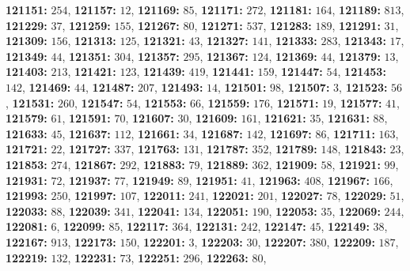 \textsf{\bfseries 121151:} $254$, \textsf{\bfseries 121157:} $12$, \textsf{\bfseries 121169:} $85$, \textsf{\bfseries 121171:} $272$, \textsf{\bfseries 121181:} $164$, \textsf{\bfseries 121189:} $813$, \textsf{\bfseries 121229:} $37$, \textsf{\bfseries 121259:} $155$, \textsf{\bfseries 121267:} $80$, \textsf{\bfseries 121271:} $537$, \textsf{\bfseries 121283:} $189$, \textsf{\bfseries 121291:} $31$, \textsf{\bfseries 121309:} $156$, \textsf{\bfseries 121313:} $125$, \textsf{\bfseries 121321:} $43$, \textsf{\bfseries 121327:} $141$, \textsf{\bfseries 121333:} $283$, \textsf{\bfseries 121343:} $17$, \textsf{\bfseries 121349:} $44$, \textsf{\bfseries 121351:} $304$, \textsf{\bfseries 121357:} $295$, \textsf{\bfseries 121367:} $124$, \textsf{\bfseries 121369:} $44$, \textsf{\bfseries 121379:} $13$, \textsf{\bfseries 121403:} $213$, \textsf{\bfseries 121421:} $123$, \textsf{\bfseries 121439:} $419$, \textsf{\bfseries 121441:} $159$, \textsf{\bfseries 121447:} $54$, \textsf{\bfseries 121453:} $142$, \textsf{\bfseries 121469:} $44$, \textsf{\bfseries 121487:} $207$, \textsf{\bfseries 121493:} $14$, \textsf{\bfseries 121501:} $98$, \textsf{\bfseries 121507:} $3$, \textsf{\bfseries 121523:} $56$, \textsf{\bfseries 121531:} $260$, \textsf{\bfseries 121547:} $54$, \textsf{\bfseries 121553:} $66$, \textsf{\bfseries 121559:} $176$, \textsf{\bfseries 121571:} $19$, \textsf{\bfseries 121577:} $41$, \textsf{\bfseries 121579:} $61$, \textsf{\bfseries 121591:} $70$, \textsf{\bfseries 121607:} $30$, \textsf{\bfseries 121609:} $161$, \textsf{\bfseries 121621:} $35$, \textsf{\bfseries 121631:} $88$, \textsf{\bfseries 121633:} $45$, \textsf{\bfseries 121637:} $112$, \textsf{\bfseries 121661:} $34$, \textsf{\bfseries 121687:} $142$, \textsf{\bfseries 121697:} $86$, \textsf{\bfseries 121711:} $163$, \textsf{\bfseries 121721:} $22$, \textsf{\bfseries 121727:} $337$, \textsf{\bfseries 121763:} $131$, \textsf{\bfseries 121787:} $352$, \textsf{\bfseries 121789:} $148$, \textsf{\bfseries 121843:} $23$, \textsf{\bfseries 121853:} $274$, \textsf{\bfseries 121867:} $292$, \textsf{\bfseries 121883:} $79$, \textsf{\bfseries 121889:} $362$, \textsf{\bfseries 121909:} $58$, \textsf{\bfseries 121921:} $99$, \textsf{\bfseries 121931:} $72$, \textsf{\bfseries 121937:} $77$, \textsf{\bfseries 121949:} $89$, \textsf{\bfseries 121951:} $41$, \textsf{\bfseries 121963:} $408$, \textsf{\bfseries 121967:} $166$, \textsf{\bfseries 121993:} $250$, \textsf{\bfseries 121997:} $107$, \textsf{\bfseries 122011:} $241$, \textsf{\bfseries 122021:} $201$, \textsf{\bfseries 122027:} $78$, \textsf{\bfseries 122029:} $51$, \textsf{\bfseries 122033:} $88$, \textsf{\bfseries 122039:} $341$, \textsf{\bfseries 122041:} $134$, \textsf{\bfseries 122051:} $190$, \textsf{\bfseries 122053:} $35$, \textsf{\bfseries 122069:} $244$, \textsf{\bfseries 122081:} $6$, \textsf{\bfseries 122099:} $85$, \textsf{\bfseries 122117:} $364$, \textsf{\bfseries 122131:} $242$, \textsf{\bfseries 122147:} $45$, \textsf{\bfseries 122149:} $38$, \textsf{\bfseries 122167:} $913$, \textsf{\bfseries 122173:} $150$, \textsf{\bfseries 122201:} $3$, \textsf{\bfseries 122203:} $30$, \textsf{\bfseries 122207:} $380$, \textsf{\bfseries 122209:} $187$, \textsf{\bfseries 122219:} $132$, \textsf{\bfseries 122231:} $73$, \textsf{\bfseries 122251:} $296$, \textsf{\bfseries 122263:} $80$, 
